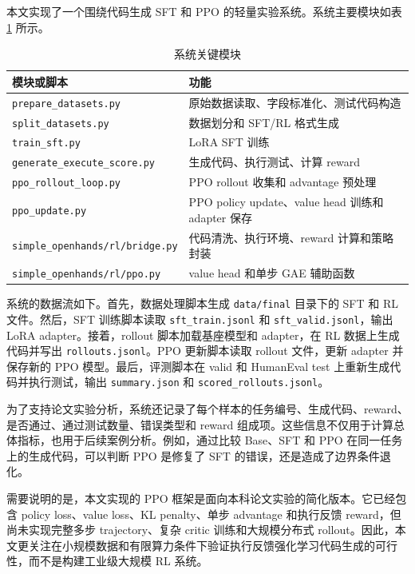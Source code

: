 本文实现了一个围绕代码生成 SFT 和 PPO 的轻量实验系统。系统主要模块如表 \ref{tab:system-modules} 所示。

\begin{table}[!htp]
  \centering
  \caption{系统关键模块}
  \label{tab:system-modules}
  \begin{tabular}{ll}
    \toprule
    模块或脚本 & 功能 \\
    \midrule
    \texttt{prepare\_datasets.py} & 原始数据读取、字段标准化、测试代码构造 \\
    \texttt{split\_datasets.py} & 数据划分和 SFT/RL 格式生成 \\
    \texttt{train\_sft.py} & LoRA SFT 训练 \\
    \texttt{generate\_execute\_score.py} & 生成代码、执行测试、计算 reward \\
    \texttt{ppo\_rollout\_loop.py} & PPO rollout 收集和 advantage 预处理 \\
    \texttt{ppo\_update.py} & PPO policy update、value head 训练和 adapter 保存 \\
    \texttt{simple\_openhands/rl/bridge.py} & 代码清洗、执行环境、reward 计算和策略封装 \\
    \texttt{simple\_openhands/rl/ppo.py} & value head 和单步 GAE 辅助函数 \\
    \bottomrule
  \end{tabular}
\end{table}

系统的数据流如下。首先，数据处理脚本生成 \texttt{data/final} 目录下的 SFT 和 RL 文件。然后，SFT 训练脚本读取 \texttt{sft\_train.jsonl} 和 \texttt{sft\_valid.jsonl}，输出 LoRA adapter。接着，rollout 脚本加载基座模型和 adapter，在 RL 数据上生成代码并写出 \texttt{rollouts.jsonl}。PPO 更新脚本读取 rollout 文件，更新 adapter 并保存新的 PPO 模型。最后，评测脚本在 valid 和 HumanEval test 上重新生成代码并执行测试，输出 \texttt{summary.json} 和 \texttt{scored\_rollouts.jsonl}。

为了支持论文实验分析，系统还记录了每个样本的任务编号、生成代码、reward、是否通过、通过测试数量、错误类型和 reward 组成项。这些信息不仅用于计算总体指标，也用于后续案例分析。例如，通过比较 Base、SFT 和 PPO 在同一任务上的生成代码，可以判断 PPO 是修复了 SFT 的错误，还是造成了边界条件退化。

需要说明的是，本文实现的 PPO 框架是面向本科论文实验的简化版本。它已经包含 policy loss、value loss、KL penalty、单步 advantage 和执行反馈 reward，但尚未实现完整多步 trajectory、复杂 critic 训练和大规模分布式 rollout。因此，本文更关注在小规模数据和有限算力条件下验证执行反馈强化学习代码生成的可行性，而不是构建工业级大规模 RL 系统。

